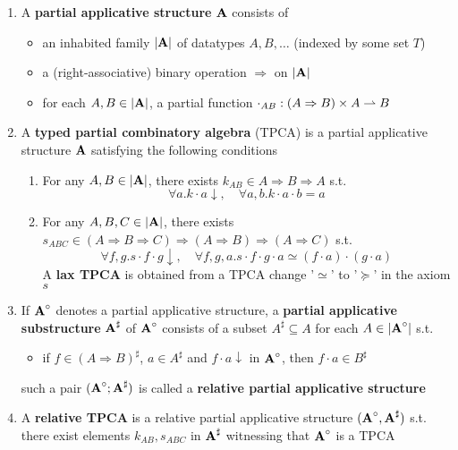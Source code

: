 \documentclass[11pt]{article}
\begin{document}
\begin{definition}[]
\label{3.1.16}
\begin{enumerate}
\item A \textbf{partial applicative structure} \(\operatorname{\textbf{A}}\) consists of
\begin{itemize}
\item an inhabited family \(\abs{\bA}\) of datatypes \(A,B,\dots\) (indexed by some set \(T\))
\item a (right-associative) binary operation \(\Rightarrow\) on \(\abs{\bA}\)
\item for each \(A,B\in\abs{\bA}\), a partial function \(\cdot_{AB}:(A\Rightarrow B)\times A\rightharpoonup B\)
\end{itemize}
\item A \textbf{typed partial combinatory algebra} (TPCA) is a partial applicative structure \(\operatorname{\textbf{A}}\)
satisfying the following conditions
\begin{enumerate}
\item For any \(A,B\in\abs{\bA}\), there exists \(k_{AB}\in A\Rightarrow B\Rightarrow A\) s.t.
\begin{equation*}
\forall a.k\cdot a\downarrow,\quad\forall a,b.k\cdot a\cdot b=a
\end{equation*}
\item For any \(A,B,C\in\abs{\bA}\), there exists \(s_{ABC}\in(A\Rightarrow B\Rightarrow C)\Rightarrow(A\Rightarrow B)\Rightarrow(A\Rightarrow C)\) s.t.
\begin{equation*}
\forall f,g. s\cdot f\cdot g\downarrow,\quad\forall f,g,a.s\cdot f\cdot g\cdot a\simeq(f\cdot a)\cdot(g\cdot a)
\end{equation*}
A \textbf{lax TPCA} is obtained from a TPCA change '\(\simeq\)' to '\(\succeq\)' in the axiom \(s\)
\end{enumerate}
\item If \(\operatorname{\textbf{A}}^\circ\) denotes a partial applicative structure, a \textbf{partial applicative
substructure} \(\operatorname{\textbf{A}}^\sharp\) of \(\operatorname{\textbf{A}}^\circ\) consists of a subset \(A^\sharp\subseteq A\) for each \(A\in\abs{\bA^\circ}\) s.t.
\begin{itemize}
\item if \(f\in(A\Rightarrow B)^\sharp\), \(a\in A^\sharp\) and \(f\cdot a\downarrow\) in \(\operatorname{\textbf{A}}^\circ\), then \(f\cdot a\in B^\sharp\)
\end{itemize}

such a pair \((\operatorname{\textbf{A}}^\circ;\operatorname{\textbf{A}}^\sharp)\) is called a \textbf{relative partial applicative structure}
\item A \textbf{relative TPCA} is a relative partial applicative structure \((\operatorname{\textbf{A}}^\circ,\operatorname{\textbf{A}}^\sharp)\) s.t. there exist
elements \(k_{AB}, s_{ABC}\) in \(\operatorname{\textbf{A}}^\sharp\) witnessing that \(\operatorname{\textbf{A}}^\circ\) is a TPCA
\end{enumerate}
\end{definition}
\end{document}
